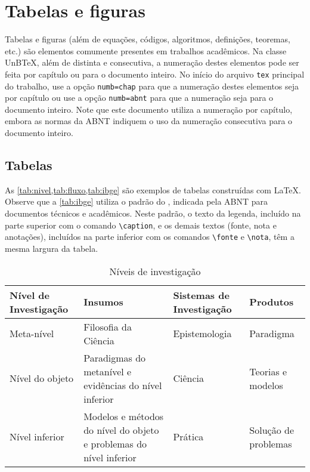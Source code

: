 \chapter{Tabelas e figuras}

Tabelas e figuras (além de equações, códigos, algoritmos, definições, teoremas, etc.) são elementos comumente presentes em trabalhos acadêmicos. Na classe UnB\TeX, além de distinta e consecutiva, a numeração destes elementos pode ser feita por capítulo ou para o documento inteiro. No início do arquivo \texttt{tex} principal do trabalho, use a opção \texttt{numb=chap} para que a numeração destes elementos seja por capítulo ou use a opção \texttt{numb=abnt} para que a numeração seja para o documento inteiro. Note que este documento utiliza a numeração por capítulo, embora as normas da ABNT indiquem o uso da numeração consecutiva para o documento inteiro.

\section{Tabelas}

As \cref{tab:nivel,tab:fluxo,tab:ibge} são exemplos de tabelas construídas com \LaTeX. Observe que a \cref{tab:ibge} utiliza o padrão do , indicada pela ABNT para documentos técnicos e acadêmicos. Neste padrão, o texto da legenda, incluído na parte superior com o comando \verb|\caption|, e os demais textos (fonte, nota e anotações), incluídos na parte inferior com os comandos \verb|\fonte| e \verb|\nota|, têm a mesma largura da tabela.

\begin{table}[htb]
\centering
\small
\caption[Níveis de investigação]{Níveis de investigação}
\label{tab:nivel}
{\renewcommand{\arraystretch}{1.3} %
\begin{tabular}{p{2.5cm}p{5.4cm}p{2.3cm}p{2.5cm}}
    \rowcolor{verdeunb!10}\textbf{Nível de Investigação} & \textbf{Insumos}  & \textbf{Sistemas de Investigação}  & \textbf{Produtos} \\ \hline
    Meta-nível & Filosofia da Ciência  & Epistemologia & Paradigma \\ \hline
    Nível do objeto & Paradigmas do metanível e evidências do nível inferior & Ciência  & Teorias e modelos \\ \hline
    Nível inferior & Modelos e métodos do nível do objeto e problemas do nível inferior & Prática & Solução de problemas \\
\end{tabular}}
\end{table}

